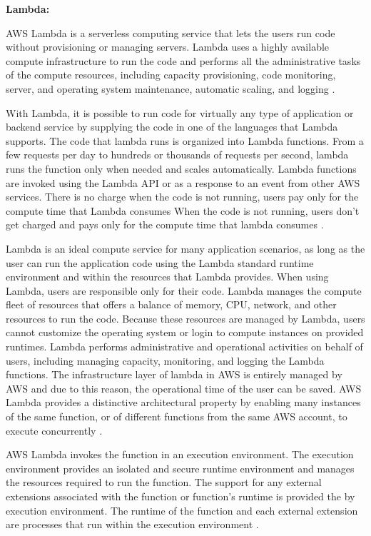 \textbf{Lambda:}
\par AWS Lambda is a serverless computing service that lets the users run code without provisioning or managing servers.
Lambda uses a highly available compute infrastructure to run the code and performs all the administrative tasks of the compute resources, including capacity provisioning, code monitoring, server, and operating system maintenance, automatic scaling, and logging \cite{45}.

\par With Lambda, it is possible to run code for virtually any type of application or backend service by supplying the code in one of the languages that Lambda supports.
The code that lambda runs is organized into Lambda functions.
From a few requests per day to hundreds or thousands of
requests per second, lambda runs the function only when
needed and scales automatically.
Lambda functions are invoked using the Lambda API or as a response to an event from other AWS services.
There is no charge when the code is not running, users pay only for the compute time that Lambda consumes
When the code is not running, users don't get charged
and pays only for the compute time
that lambda consumes \cite{46}.

\par Lambda is an ideal compute service for many application scenarios, as long as the user can run the application code using the Lambda standard runtime environment and within the resources that Lambda provides.
When using Lambda, users are responsible only for their code.
Lambda manages the compute fleet of resources that offers a balance of memory, CPU, network, and other resources to run the code.
Because these resources are managed by Lambda, users cannot customize the operating system or login to compute instances on provided runtimes.
Lambda performs administrative and operational activities on behalf of users, including managing capacity, monitoring, and logging the Lambda functions.
The infrastructure layer of lambda in AWS is entirely managed by AWS and due to this reason, the operational time of the user can be saved.
AWS Lambda
provides a distinctive architectural property by enabling
many instances of the same function, or of different functions from the same AWS account, to execute concurrently \cite{46}.

\par AWS Lambda invokes the function in an execution environment.
The execution environment provides an isolated and secure runtime environment and manages the resources required to run the function.
The support for any external extensions associated with
the function or function's runtime is provided the by
execution environment.
The runtime of the function and each external extension are
processes that run within the execution environment
\cite{46}.

